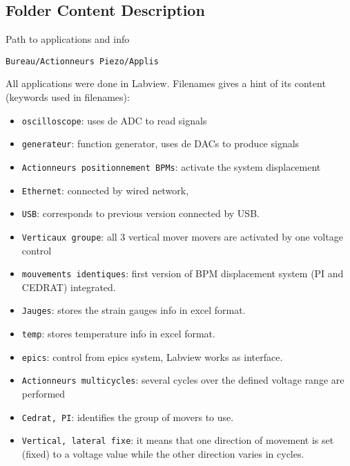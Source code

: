 \subsection{Folder Content Description}\par
Path to applications and info\par
\verb?Bureau/Actionneurs Piezo/Applis?\par
All applications were done in Labview. Filenames gives a hint of its content (keywords used in filenames):\par
\begin{itemize}
\item \verb?oscilloscope?: uses de ADC to read signals
\item \verb?generateur?: function generator, uses de DACs to produce signals
\item \verb?Actionneurs positionnement BPMs?: activate the system displacement
\item \verb?Ethernet?: connected by wired network,
\item \verb?USB?: corresponds to previous version connected by USB.
\item \verb?Verticaux groupe?: all 3 vertical mover movers are activated by one voltage control
\item \verb?mouvements identiques?: first version of BPM displacement system (PI and CEDRAT) integrated.
\item \verb?Jauges?: stores the strain gauges info in excel format.
\item \verb?temp?: stores temperature info in excel format.
\item \verb?epics?: control from epics system, Labview works as interface.
\item \verb?Actionneurs multicycles?: several cycles over the defined voltage range are performed
\item \verb?Cedrat, PI?: identifies the group of movers to use.
\item \verb?Vertical, lateral fixe?: it means that one direction of movement is set (fixed) to a voltage value while the other direction varies in cycles.
\end{itemize}

